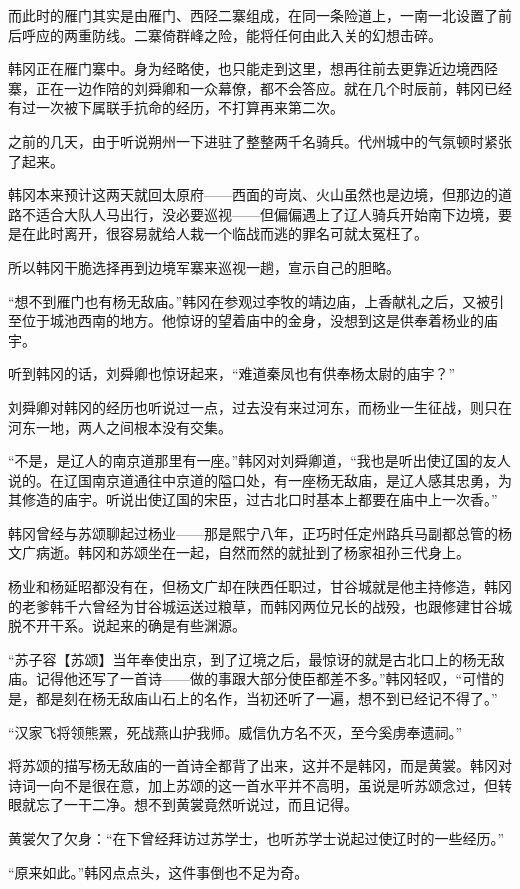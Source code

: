 而此时的雁门其实是由雁门、西陉二寨组成，在同一条险道上，一南一北设置了前后呼应的两重防线。二寨倚群峰之险，能将任何由此入关的幻想击碎。

韩冈正在雁门寨中。身为经略使，也只能走到这里，想再往前去更靠近边境西陉寨，正在一边作陪的刘舜卿和一众幕僚，都不会答应。就在几个时辰前，韩冈已经有过一次被下属联手抗命的经历，不打算再来第二次。

之前的几天，由于听说朔州一下进驻了整整两千名骑兵。代州城中的气氛顿时紧张了起来。

韩冈本来预计这两天就回太原府——西面的岢岚、火山虽然也是边境，但那边的道路不适合大队人马出行，没必要巡视——但偏偏遇上了辽人骑兵开始南下边境，要是在此时离开，很容易就给人栽一个临战而逃的罪名可就太冤枉了。

所以韩冈干脆选择再到边境军寨来巡视一趟，宣示自己的胆略。

“想不到雁门也有杨无敌庙。”韩冈在参观过李牧的靖边庙，上香献礼之后，又被引至位于城池西南的地方。他惊讶的望着庙中的金身，没想到这是供奉着杨业的庙宇。

听到韩冈的话，刘舜卿也惊讶起来，“难道秦凤也有供奉杨太尉的庙宇？”

刘舜卿对韩冈的经历也听说过一点，过去没有来过河东，而杨业一生征战，则只在河东一地，两人之间根本没有交集。

“不是，是辽人的南京道那里有一座。”韩冈对刘舜卿道，“我也是听出使辽国的友人说的。在辽国南京道通往中京道的隘口处，有一座杨无敌庙，是辽人感其忠勇，为其修造的庙宇。听说出使辽国的宋臣，过古北口时基本上都要在庙中上一次香。”

韩冈曾经与苏颂聊起过杨业——那是熙宁八年，正巧时任定州路兵马副都总管的杨文广病逝。韩冈和苏颂坐在一起，自然而然的就扯到了杨家祖孙三代身上。

杨业和杨延昭都没有在，但杨文广却在陕西任职过，甘谷城就是他主持修造，韩冈的老爹韩千六曾经为甘谷城运送过粮草，而韩冈两位兄长的战殁，也跟修建甘谷城脱不开干系。说起来的确是有些渊源。

“苏子容【苏颂】当年奉使出京，到了辽境之后，最惊讶的就是古北口上的杨无敌庙。记得他还写了一首诗——做的事跟大部分使臣都差不多。”韩冈轻叹，“可惜的是，都是刻在杨无敌庙山石上的名作，当初还听了一遍，想不到已经记不得了。”

“汉家飞将领熊罴，死战燕山护我师。威信仇方名不灭，至今奚虏奉遗祠。”

将苏颂的描写杨无敌庙的一首诗全都背了出来，这并不是韩冈，而是黄裳。韩冈对诗词一向不是很在意，加上苏颂的这一首水平并不高明，虽说是听苏颂念过，但转眼就忘了一干二净。想不到黄裳竟然听说过，而且记得。

黄裳欠了欠身：“在下曾经拜访过苏学士，也听苏学士说起过使辽时的一些经历。”

“原来如此。”韩冈点点头，这件事倒也不足为奇。


